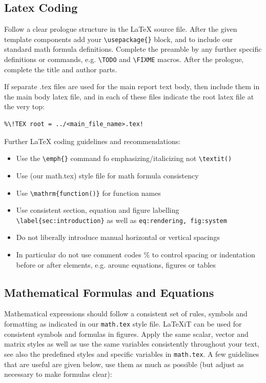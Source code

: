\documentclass[11pt, a4paper,oneside,chapterprefix=false]{scrbook}
\newcommand{\FIXME}[1]{{\color{RED}{\textbf{FIX}: #1}}}
\begin{document}
\subsection*{Latex Coding}

Follow a clear prologue structure in the LaTeX source file. After the given template components add your \verb!\usepackage{}! block, and \verb!! to include our standard math formula definitions. Complete the preamble by any further specific definitions or commands, e.g. \verb!\TODO! and \verb!\FIXME! macros. After the prologue, complete the title and author parts.

If separate .tex files are used for the main report text body, then include them in the main body latex file, and in each of these files indicate the root latex file at the very top:
\begin{verbatim}
%\!TEX root = ../<main_file_name>.tex!
\end{verbatim}

\noindent
Further LaTeX coding guidelines and recommendations:

\begin{itemize}
\item Use the \verb!\emph{}! command fo emphasizing/italicizing not \verb!\textit()!
\item Use (our math.tex) style file for math formula consistency
\item Use \verb!\mathrm{function()}!  for function names
\item Use consistent section, equation and figure labelling
\verb!\label{sec:introduction}! as well as \texttt{eq:rendering, fig:system}
\item Do not liberally introduce manual horizontal or vertical spacings
\item In particular do not use comment codes \% to control spacing or indentation before or after elements, e.g. arounc equations, figures or tables
\end{itemize}

\subsection*{Mathematical Formulas and Equations}

Mathematical expressions should follow a consistent set of rules, symbols and formatting as indicated in our \texttt{math.tex} style file. LaTeXiT can be used for consistent symbols and formulas in figures. Apply the same scalar, vector and matrix styles as well as use the same variables consistently throughout your text, see also the predefined styles and specific variables in \texttt{math.tex}. A few guidelines that are useful are given below, use them as much as possible (but adjust as necessary to make formulas clear):
\end{document}
